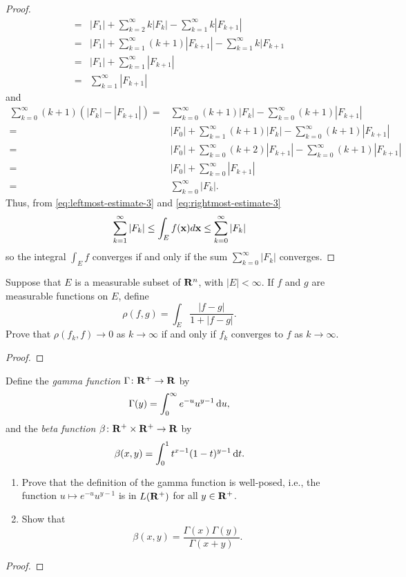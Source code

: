 \begin{proof}
\begin{equation}
\begin{aligned}
={}&|F_1|+\sum_{k=2}^\infty k|F_k|-\sum_{k=1}^\infty k|F_{k+1}|\\
={}&|F_1|+\sum_{k=1}^\infty(k+1)|F_{k+1}|-\sum_{k=1}^\infty k|F_{k+1}\\
={}&|F_1|+\sum_{k=1}^\infty |F_{k+1}|\\
={}&\sum_{k=1}^\infty|F_{k+1}|
\end{aligned}
\end{equation}
and
\begin{equation}
\label{eq:rightmost-estimate-3}
\begin{aligned}
\sum_{k=0}^\infty(k+1)\left(|F_k|-|F_{k+1}|\right)
={}&\sum_{k=0}^\infty(k+1)|F_k|-\sum_{k=0}^\infty(k+1)|F_{k+1}|\\
={}&|F_0|+\sum_{k=1}^\infty(k+1)|F_k|-\sum_{k=0}^\infty(k+1)|F_{k+1}|\\
={}&|F_0|+\sum_{k=0}^\infty(k+2)|F_{k+1}|-\sum_{k=0}^\infty(k+1)|F_{k+1}|\\
={}&|F_0|+\sum_{k=0}^\infty|F_{k+1}|\\
={}&\sum_{k=0}^\infty|F_k|.
\end{aligned}
\end{equation}
Thus, from \eqref{eq:leftmost-estimate-3} and
\eqref{eq:rightmost-estimate-3}
\begin{equation}
\label{eq:final-upper-lower-estimates-3}
\sum_{k=1}^\infty|F_k|\leq\int_E f(\mathbf{x}) d \mathbf{x}\leq\sum_{k=0}^\infty|F_k|
\end{equation}
so the integral $\int_E f$ converges if and only if the sum
$\sum_{k=0}^\infty|F_k|$ converges.
\end{proof}
\begin{problem}
Suppose that $E$ is a measurable subset of $\mathbf{R}^n$, with
$|E|<\infty$. If $f$ and $g$ are measurable functions on
$E$, define
\[
\rho(f,g)=\int_E\frac{|f-g|}{1+|f-g|}.
\]
Prove that $\rho(f_k,f)\to 0$ as $k\to\infty$ if and only if $f_k$
converges to $f$ as $k\to\infty$.
\end{problem}
\begin{proof}
\end{proof}

\begin{problem}
Define the \emph{gamma function} $\Gamma\colon\mathbf{R}^+\to\mathbf{R}$ by
\[
\Gamma(y)=\int_0^\infty e^{-u}u^{y-1}\mathop{}\!\mathrm{d} u,
\]
and the \emph{beta function} $\beta\colon\mathbf{R}^+\times\mathbf{R}^+\to\mathbf{R}$
by
\[
\beta(x,y)=\int_0^1 t^{x-1}(1-t)^{y-1}\mathop{}\!\mathrm{d} t.
\]
\begin{enumerate}[label=(\alph*)]
\item Prove that the definition of the gamma function is well-posed, i.e.,
the function $u\mapsto e^{-u}u^{y-1}$ is in $L(\mathbf{R}^+)$ for all
$y\in\mathbf{R}^+$.
\item Show that
\[
\beta(x,y)=\frac{\Gamma(x)\Gamma(y)}{\Gamma(x+y)}.
\]
\end{enumerate}
\end{problem}
\begin{proof}
\end{proof}

